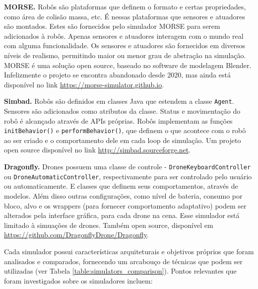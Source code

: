 \textbf{MORSE.} Robôs são plataformas que definem o formato e certas propriedades, como área de colisão massa, etc. É nessas plataformas que sensores e atuadores são montados. Estes são fornecidos pelo simulador MORSE para serem adicionados à robôs. Apenas sensores e atuadores interagem com o mundo real com alguma funcionalidade. Os sensores e atuadores são fornecidos em diversos níveis de realismo, permitindo maior ou menor grau de abstração na simulação. MORSE é uma solução open source, baseado no software de modelagem Blender. Infelizmente o projeto se encontra abandonado desde 2020, mas ainda está disponível no link \url{https://morse-simulator.github.io}.

\textbf{Simbad.} Robôs são definidos em classes Java que estendem a classe \texttt{Agent}. Sensores são adicionados como atributos da classe. Status e movimentação do robô é alcançado através de APIs próprias. Robôs implementam as funções \texttt{initBehavior()} e \texttt{performBehavior()}, que definem o que acontece com o robô ao ser criado e o comportamento dele em cada loop de simulação. Um projeto open source disponível no link \url{http://simbad.sourceforge.net}.

\textbf{Dragonfly.} Drones possuem uma classe de controle - \texttt{DroneKeyboardController} ou \texttt{DroneAutomaticController}, respectivamente para ser controlado pelo usuário ou automaticamente. E classes que definem seus comportamentos, através de modelos. Além disso outras configurações, como nível de bateria, consumo por bloco, alvo e os wrappers (para fornecer comportamento adaptativo)  podem ser alterados pela interface gráfica, para cada drone na cena. Esse simulador está limitado à simuações de drones. Também open source, disponível em \url{https://github.com/DragonflyDrone/Dragonfly}.

Cada simulador possui características arquiteturais e objetivos próprios que foram analisados e comparados, fornecendo um arcabouço de técnicas que podem ser utilizadas (ver Tabela \ref{table:simulators_comparison}). Pontos relevantes que foram investigados sobre os simuladores incluem: 


